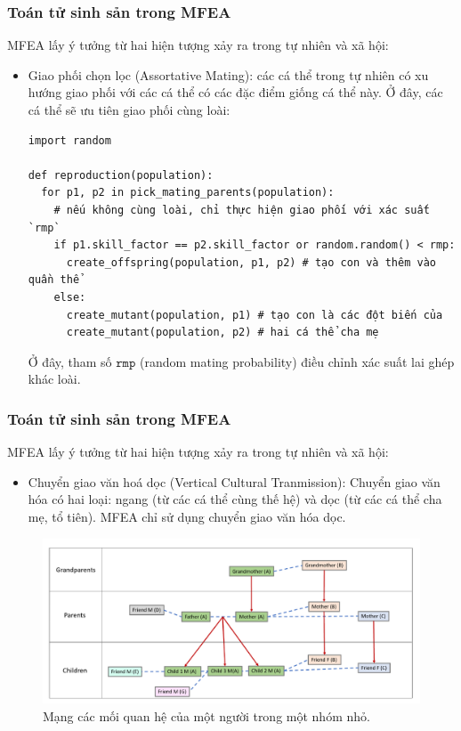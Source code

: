 \begin{frame}[fragile]
\frametitle{Toán tử sinh sản trong MFEA}
MFEA lấy ý tưởng từ hai hiện tượng xảy ra trong tự nhiên và xã hội:
\begin{itemize}
\item Giao phối chọn lọc (Assortative Mating): các cá thể trong tự nhiên có xu
  hướng giao phối với các cá thể có các đặc điểm giống cá thể này. Ở đây, các cá
  thể sẽ ưu tiên giao phối cùng loài:
\begin{verbatim}
import random

def reproduction(population):
  for p1, p2 in pick_mating_parents(population):
    # nếu không cùng loài, chỉ thực hiện giao phối với xác suất `rmp`
    if p1.skill_factor == p2.skill_factor or random.random() < rmp:
      create_offspring(population, p1, p2) # tạo con và thêm vào quần thể
    else:
      create_mutant(population, p1) # tạo con là các đột biến của
      create_mutant(population, p2) # hai cá thể cha mẹ
\end{verbatim}
Ở đây, tham số $\texttt{rmp}$ (random mating probability) điều chỉnh xác suất
lai ghép khác loài.
\end{itemize}
\end{frame}

\begin{frame}[fragile]
\frametitle{Toán tử sinh sản trong MFEA}
MFEA lấy ý tưởng từ hai hiện tượng xảy ra trong tự nhiên và xã hội:
\begin{itemize}
\item Chuyển giao văn hoá dọc (Vertical Cultural Tranmission): Chuyển giao văn
  hóa có hai loại: ngang (từ các cá thể cùng thế hệ) và dọc (từ các cá thể cha
  mẹ, tổ tiên). MFEA chỉ sử dụng chuyển giao văn hóa dọc.
\end{itemize}
  \begin{figure}
    \centering
    \includegraphics[height=0.5\textheight]{res/vct.png}
    \caption{Mạng các mối quan hệ của một người trong một nhóm nhỏ.}
  \end{figure}
\end{frame}

